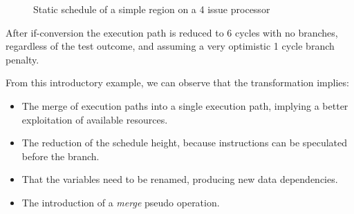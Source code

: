 \begin{figure}
\vspace{1cm}
\caption{Static schedule of a simple region on a 4 issue processor}
\label{fig:example1}
\end{figure}

After if-conversion the execution path is reduced to 6 cycles with no branches, regardless of the test outcome, and assuming a very optimistic 1 cycle branch penalty. 

From this introductory example, we can observe that the transformation implies:

\begin{itemize}
\item The merge of execution paths into a single execution path, implying a  better exploitation of available resources.  
\item The reduction of the schedule height, because instructions can be speculated before the branch.
\item That the variables need to be renamed, producing new data dependencies.
\item The introduction of a \textit{merge} pseudo operation.
\end{itemize}

